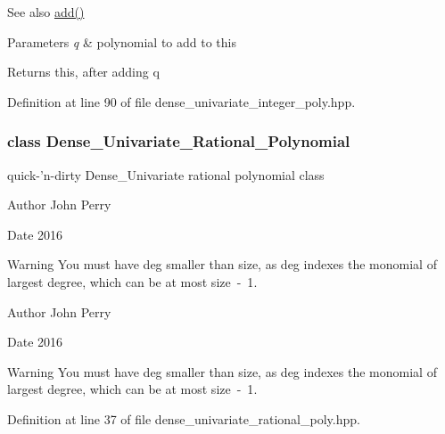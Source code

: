 \begin{DoxySeeAlso}{See also}
\hyperlink{group__polygroup_a9aed4c0d2f30a93f79a11f8ab102601f}{add()} 
\end{DoxySeeAlso}

\begin{DoxyParams}{Parameters}
{\em q} & polynomial to add to {\ttfamily this} \\
\hline
\end{DoxyParams}
\begin{DoxyReturn}{Returns}
{\ttfamily this}, after adding {\ttfamily q} 
\end{DoxyReturn}


Definition at line 90 of file dense\+\_\+univariate\+\_\+integer\+\_\+poly.\+hpp.

\label{class_dense___univariate___rational___polynomial}
\subsubsection{class Dense\+\_\+\+Univariate\+\_\+\+Rational\+\_\+\+Polynomial}
quick-\/'n-\/dirty Dense\+\_\+\+Univariate rational polynomial class 

\begin{DoxyAuthor}{Author}
John Perry 
\end{DoxyAuthor}
\begin{DoxyDate}{Date}
2016 
\end{DoxyDate}
\begin{DoxyWarning}{Warning}
You must have {\ttfamily deg} smaller than {\ttfamily size}, as {\ttfamily deg} indexes the monomial of largest degree, which can be at most {\ttfamily size~-\/~1}.
\end{DoxyWarning}
\begin{DoxyAuthor}{Author}
John Perry 
\end{DoxyAuthor}
\begin{DoxyDate}{Date}
2016 
\end{DoxyDate}
\begin{DoxyWarning}{Warning}
You must have {\ttfamily deg} smaller than {\ttfamily size}, as {\ttfamily deg} indexes the monomial of largest degree, which can be at most {\ttfamily size~-\/~1}. 
\end{DoxyWarning}


Definition at line 37 of file dense\+\_\+univariate\+\_\+rational\+\_\+poly.\+hpp.


